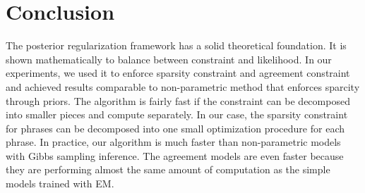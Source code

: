 \section{Conclusion}
The posterior regularization framework has a solid theoretical foundation.
It is shown mathematically to balance between constraint and likelihood.
In our experiments,
we used it to enforce sparsity constraint and agreement constraint and
achieved results comparable to non-parametric method that enforces
sparcity through priors. The algorithm is fairly fast if the constraint
can be decomposed into smaller pieces and compute separately. In our case,
the sparsity constraint for phrases can be decomposed into one small optimization
procedure for each phrase. In practice, our algorithm is much 
faster than non-parametric models with Gibbs sampling inference. 
The agreement
models are even faster because they are performing almost the same amount
of computation as the simple models trained with EM.
